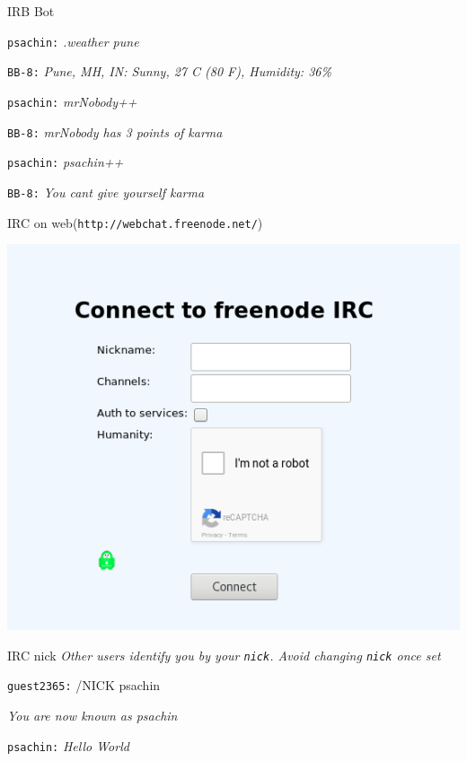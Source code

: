 \documentclass[10pt]{beamer}
\begin{document}
\begin{frame}[fragile,label={sec:org7579259}]{IRB Bot}
 \begin{block}{}
\texttt{psachin:} \emph{.weather pune}

\texttt{BB-8:} \emph{Pune, MH, IN: Sunny, 27 C (80 F), Humidity: 36\%}
\end{block}


\begin{block}{}
\texttt{psachin:} \emph{mrNobody++}

\texttt{BB-8:} \emph{mrNobody has 3 points of karma}
\end{block}


\begin{block}{}
\texttt{psachin:} \emph{psachin++}

\texttt{BB-8:} \emph{You cant give yourself karma}
\end{block}
\end{frame}


\begin{frame}[fragile,label={sec:org5f522f3}]{IRC on web(\texttt{http://webchat.freenode.net/})}
 \begin{center}
\includegraphics[width=.9\linewidth]{./webchat.freenode.png}
\end{center}
\end{frame}

\begin{frame}[fragile,label={sec:org004d058}]{IRC nick}
 \emph{Other users identify you by your \texttt{nick}. Avoid changing \texttt{nick}
once set}

\begin{block}{}
\texttt{guest2365:} /NICK psachin

\emph{You are now known as psachin}

\texttt{psachin:} \emph{Hello World}
\end{block}
\end{frame}
\end{document}
